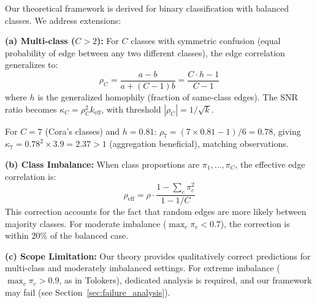 \begin{remark}
\label{rem:multiclass_extension}
Our theoretical framework is derived for binary classification with balanced classes. We address extensions:

\textbf{(a) Multi-class ($C > 2$):}
For $C$ classes with symmetric confusion (equal probability of edge between any two different classes), the edge correlation generalizes to:
\begin{equation}
    \rho_C = \frac{a - b}{a + (C-1)b} = \frac{C \cdot h - 1}{C - 1}
\end{equation}
where $h$ is the generalized homophily (fraction of same-class edges). The SNR ratio becomes $\kappa_C = \rho_C^2 k_{\mathrm{eff}}$, with threshold $|\rho_C| = 1/\sqrt{k}$.

For $C = 7$ (Cora's classes) and $h = 0.81$: $\rho_7 = (7 \times 0.81 - 1)/6 = 0.78$, giving $\kappa_7 = 0.78^2 \times 3.9 = 2.37 > 1$ (aggregation beneficial), matching observations.

\textbf{(b) Class Imbalance:}
When class proportions are $\pi_1, \ldots, \pi_C$, the effective edge correlation is:
\begin{equation}
    \rho_{\mathrm{eff}} = \rho \cdot \frac{1 - \sum_c \pi_c^2}{1 - 1/C}
\end{equation}
This correction accounts for the fact that random edges are more likely between majority classes. For moderate imbalance ($\max_c \pi_c < 0.7$), the correction is within 20\% of the balanced case.

\textbf{(c) Scope Limitation:}
Our theory provides qualitatively correct predictions for multi-class and moderately imbalanced settings. For extreme imbalance ($\max_c \pi_c > 0.9$, as in Tolokers), dedicated analysis is required, and our framework may fail (see Section~\ref{sec:failure_analysis}).
\end{remark}
